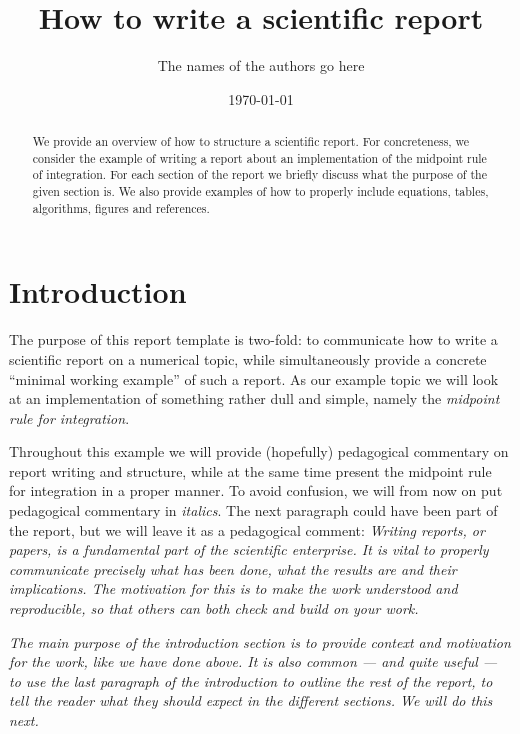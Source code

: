 \documentclass[english,notitlepage,reprint,nofootinbib]{revtex4-1}  %
\begin{document}
	
	\title{How to write a scientific report}  %
	\author{The names of the authors go here} %
	\date{\today}                             %
	\noaffiliation                            %
	
	\begin{abstract}
		We provide an overview of how to structure a scientific report. For concreteness, we consider the example of writing a report about an implementation of the midpoint rule of integration. For each section of the report we briefly discuss what the purpose of the given section is. We also provide examples of how to properly include equations, tables, algorithms, figures and references.
	\end{abstract}
	\maketitle
	
	
	\section{Introduction}
	The purpose of this report template is two-fold: to communicate how to write a scientific report on a numerical topic, while simultaneously provide a concrete ``minimal working example'' of such a report. As our example topic we will look at an implementation of something rather dull and simple, namely the \textit{midpoint rule for integration}.
	
	Throughout this example we will provide (hopefully) pedagogical commentary on report writing and structure, while at the same time present the midpoint rule for integration in a proper manner. To avoid confusion, we will from now on put pedagogical commentary in \textit{italics}. The next paragraph could have been part of the report, but we will leave it as a pedagogical comment: \textit{Writing reports, or papers, is a fundamental part of the scientific enterprise. It is vital to properly communicate precisely what has been done, what the results are and their implications. The motivation for this is to make the work understood and reproducible, so that others can both check and build on your work.}
	
	\textit{The main purpose of the introduction section is to provide context and motivation for the work, like we have done above. It is also common --- and quite useful --- to use the last paragraph of the introduction to outline the rest of the report, to tell the reader what they should expect in the different sections. We will do this next.}
	
\end{document}
